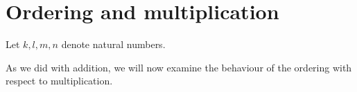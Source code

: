 \documentclass[../../arithmetic.tex]{subfiles}
\begin{document}
  \section{Ordering and multiplication}

  \begin{forthel}
  \end{forthel}

  \begin{forthel}
  \end{forthel}

  \begin{forthel}
    Let $k, l, m, n$ denote natural numbers.
  \end{forthel}

  \noindent As we did with addition, we will now examine the behaviour of the
  ordering with respect to multiplication.
\end{document}
